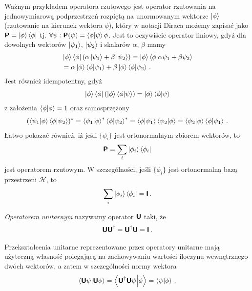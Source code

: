 \documentclass{myclass}
\begin{document}
Ważnym przykładem operatora rzutowego jest operator rzutowania na jednowymiarową podprzestrzeń
rozpiętą na unormowanym wektorze \(\ket{\phi}\) (rzutowanie na kierunek wektora \(\phi\)), który w
notacji Diraca możemy zapisać jako \(\boldsymbol{\mathsf{P}} = \ket{\phi}\bra{\phi}\) tj. \(\forall \psi :
\boldsymbol{\mathsf{P}}(\psi) = \braket{\phi}{\psi}\phi\). Jest to oczywiście operator liniowy, gdyż dla dowolnych
wektorów \(\ket{\psi_1}\), \(\ket{\psi_2}\) i skalarów \(\alpha\), \(\beta\) mamy
\begin{equation*}
    \begin{split}
        &\ket{\phi}\bra{\phi}(\alpha\ket{\psi_1} + \beta\ket{\psi_2}) = \ket{\phi}\braket{\phi}{\alpha\psi_1 + \beta\psi_2} \\
        &= \alpha\ket{\phi} \braket{\phi}{\psi_1} + \beta\ket{\phi}\braket{\phi}{\psi_2}\,.
    \end{split}
\end{equation*}
Jest również idempotentny, gdyż 
\begin{equation*}
    \ket{\phi}\bra{\phi}(\ket{\phi}\braket{\phi}{\psi}) =  \ket{\phi}\braket{\phi}{\psi}
\end{equation*}
z założenia \(\braket{\phi} = 1\) oraz samosprzężony
\begin{equation*}
    (\braket{\psi_1}{\phi}\braket{\phi}{\psi_2})^* = \braket{\psi_1}{\phi}^*\braket{\phi}{\psi_2}^* = \braket{\phi}{\psi_1}\braket{\psi_2}{\phi} = \braket{\psi_2}{\phi}\braket{\phi}{\psi_1}\,.
\end{equation*}
Łatwo pokazać również, iż jeśli \(\{\phi_i\}\) jest ortonormalnym zbiorem wektorów, to
\begin{equation*}
    \boldsymbol{\mathsf{P}} = \sum_i \ket{\phi_i}\bra{\phi_i}
\end{equation*}
jest operatorem rzutowym. W szczególności, jeśli \(\{\phi_i\}\) jest ortonormalną bazą przestrzeni
\(\mathscr{H}\), to
\begin{equation*}
    \sum_i \ket{\phi_i}\bra{\phi_i} = \boldsymbol{\mathsf{I}}\,.
\end{equation*}

\linesep

\begin{definition}
\textit{Operatorem unitarnym} nazywamy operator \(\boldsymbol{\mathsf{U}}\) taki, że
\begin{equation*}
    \boldsymbol{\mathsf{U}}\boldsymbol{\mathsf{U}}^\dagger = \boldsymbol{\mathsf{U}}^\dagger\boldsymbol{\mathsf{U}} = \boldsymbol{\mathsf{I}}\,.
\end{equation*}
\end{definition}

Przekształcenia unitarne reprezentowane przez operatory unitarne mają użyteczną własność polegającą
na zachowywaniu wartości iloczynu wewnętrznego dwóch wektorów, a zatem w szczególności normy wektora
\begin{equation*}
    \braket{\boldsymbol{\mathsf{U}}\psi}{\boldsymbol{\mathsf{U}}\phi} = \braket{\boldsymbol{\mathsf{U}}^\dagger\boldsymbol{\mathsf{U}}\psi}{\phi} = \braket{\psi}{\phi}\,.
\end{equation*}
\end{document}
